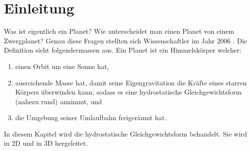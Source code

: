 %
%
%
%
\section{Einleitung\label{planet:section:einleitung}}
Was ist eigentlich ein Planet?
Wie unterscheidet man einen Planet von einem Zwergplanet?
Genau diese Fragen stellten sich Wissenschaftler im Jahr 2006 \cite{planet:iaub5}.
Die Definition sieht folgendermassen aus.
Ein Planet ist ein Himmelskörper welcher:
\begin{enumerate}
	\item einen Orbit um eine Sonne hat,
	\item ausreichende Masse hat, damit seine Eigengravitation die Kräfte eines starren Körpers überwinden kann, sodass es eine hydrostatische Gleichgewichtsform (nahezu rund) annimmt, und
	\item die Umgebung seiner Umlaufbahn freigeräumt hat.
\end{enumerate}

\noindent
In diesem Kapitel wird die hydrostatische Gleichgewichtsform behandelt.
Sie wird in 2D und in 3D hergeleitet.


